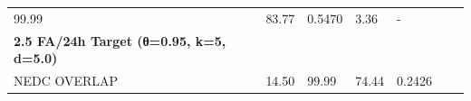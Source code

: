 \documentclass[
  10pt,
]{article}
\begin{document}
\begin{longtable}[]{@{}lllllll@{}}
\begin{minipage}[t]{0.12\columnwidth}
99.99\strut
\end{minipage} & \begin{minipage}[t]{0.12\columnwidth}\raggedright
83.77\strut
\end{minipage} & \begin{minipage}[t]{0.12\columnwidth}\raggedright
0.5470\strut
\end{minipage} & \begin{minipage}[t]{0.12\columnwidth}\raggedright
3.36\strut
\end{minipage} & \begin{minipage}[t]{0.12\columnwidth}\raggedright
-\strut
\end{minipage}\tabularnewline
\begin{minipage}[t]{0.12\columnwidth}\raggedright
\textbf{2.5 FA/24h Target (θ=0.95, k=5, d=5.0)}\strut
\end{minipage} & \begin{minipage}[t]{0.12\columnwidth}\raggedright
\strut
\end{minipage} & \begin{minipage}[t]{0.12\columnwidth}\raggedright
\strut
\end{minipage} & \begin{minipage}[t]{0.12\columnwidth}\raggedright
\strut
\end{minipage} & \begin{minipage}[t]{0.12\columnwidth}\raggedright
\strut
\end{minipage} & \begin{minipage}[t]{0.12\columnwidth}\raggedright
\strut
\end{minipage} & \begin{minipage}[t]{0.12\columnwidth}\raggedright
\strut
\end{minipage}\tabularnewline
\begin{minipage}[t]{0.12\columnwidth}\raggedright
NEDC OVERLAP\strut
\end{minipage} & \begin{minipage}[t]{0.12\columnwidth}\raggedright
14.50\strut
\end{minipage} & \begin{minipage}[t]{0.12\columnwidth}\raggedright
99.99\strut
\end{minipage} & \begin{minipage}[t]{0.12\columnwidth}\raggedright
74.44\strut
\end{minipage} & \begin{minipage}[t]{0.12\columnwidth}\raggedright
0.2426\strut
\end{minipage} & \begin{minipage}[t]{0.12\columnwidth}\raggedright

\end{minipage}
\end{longtable}
\end{document}
